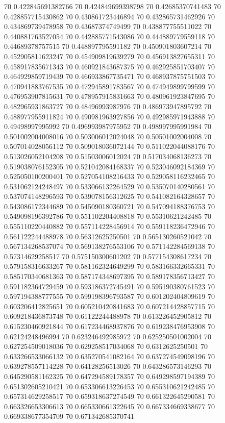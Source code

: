 {70 0.422845691382766
70 0.424849699398798
70 0.42685370741483
70 0.428857715430862
70 0.430861723446894
70 0.432865731462926
70 0.434869739478958
70 0.43687374749499
70 0.438877755511022
70 0.440881763527054
70 0.442885771543086
70 0.444889779559118
70 0.44689378757515
70 0.448897795591182
70 0.450901803607214
70 0.452905811623247
70 0.454909819639279
70 0.456913827655311
70 0.458917835671343
70 0.460921843687375
70 0.462925851703407
70 0.464929859719439
70 0.466933867735471
70 0.468937875751503
70 0.470941883767535
70 0.472945891783567
70 0.474949899799599
70 0.476953907815631
70 0.478957915831663
70 0.480961923847695
70 0.482965931863727
70 0.48496993987976
70 0.486973947895792
70 0.488977955911824
70 0.490981963927856
70 0.492985971943888
70 0.49498997995992
70 0.496993987975952
70 0.498997995991984
70 0.501002004008016
70 0.503006012024048
70 0.50501002004008
70 0.507014028056112
70 0.509018036072144
70 0.511022044088176
70 0.513026052104208
70 0.51503006012024
70 0.517034068136273
70 0.519038076152305
70 0.521042084168337
70 0.523046092184369
70 0.525050100200401
70 0.527054108216433
70 0.529058116232465
70 0.531062124248497
70 0.533066132264529
70 0.535070140280561
70 0.537074148296593
70 0.539078156312625
70 0.541082164328657
70 0.543086172344689
70 0.545090180360721
70 0.547094188376753
70 0.549098196392786
70 0.551102204408818
70 0.55310621242485
70 0.555110220440882
70 0.557114228456914
70 0.559118236472946
70 0.561122244488978
70 0.56312625250501
70 0.565130260521042
70 0.567134268537074
70 0.569138276553106
70 0.571142284569138
70 0.57314629258517
70 0.575150300601202
70 0.577154308617234
70 0.579158316633267
70 0.581162324649299
70 0.583166332665331
70 0.585170340681363
70 0.587174348697395
70 0.589178356713427
70 0.591182364729459
70 0.593186372745491
70 0.595190380761523
70 0.597194388777555
70 0.599198396793587
70 0.601202404809619
70 0.603206412825651
70 0.605210420841683
70 0.607214428857715
70 0.609218436873748
70 0.61122244488978
70 0.613226452905812
70 0.615230460921844
70 0.617234468937876
70 0.619238476953908
70 0.62124248496994
70 0.623246492985972
70 0.625250501002004
70 0.627254509018036
70 0.629258517034068
70 0.6312625250501
70 0.633266533066132
70 0.635270541082164
70 0.637274549098196
70 0.639278557114228
70 0.64128256513026
70 0.643286573146293
70 0.645290581162325
70 0.647294589178357
70 0.649298597194389
70 0.651302605210421
70 0.653306613226453
70 0.655310621242485
70 0.657314629258517
70 0.659318637274549
70 0.661322645290581
70 0.663326653306613
70 0.665330661322645
70 0.667334669338677
70 0.669338677354709
70 0.671342685370741
}
